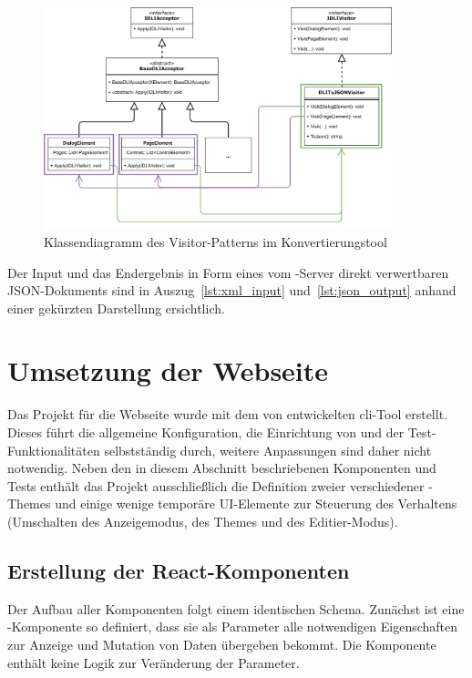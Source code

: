 \begin{figure}[htb]
    \centering
    \captionsetup{justification=centering}
    \includegraphics[width=0.9\textwidth]{figures/web-converter_class-diagramm.png}
        \caption{Klassendiagramm des Visitor-Patterns im Konvertierungstool}\label{fig:web-conv_class-diagramm}
\end{figure}

Der Input und das Endergebnis in Form eines vom -Server direkt verwertbaren JSON-Dokuments sind in Auszug~\ref{lst:xml_input} und~\ref{lst:json_output} anhand einer gekürzten Darstellung ersichtlich.





\section{Umsetzung der Webseite}
Das Projekt für die Webseite wurde mit dem von  entwickelten \gls{cli}-Tool  erstellt. Dieses führt die allgemeine Konfiguration, die Einrichtung von  und der Test-Funktionalitäten selbstständig durch, weitere Anpassungen sind daher nicht notwendig. Neben den in diesem Abschnitt beschriebenen Komponenten und Tests enthält das Projekt ausschließlich die Definition zweier verschiedener -Themes und einige wenige temporäre UI-Elemente zur Steuerung des Verhaltens (Umschalten des Anzeigemodus, des Themes und des Editier-Modus).

\subsection{Erstellung der React-Komponenten}
Der Aufbau aller Komponenten folgt einem identischen Schema. Zunächst ist eine -Komponente so definiert, dass sie als Parameter alle notwendigen Eigenschaften zur Anzeige und Mutation von Daten übergeben bekommt. Die Komponente enthält keine Logik zur Veränderung der Parameter.

